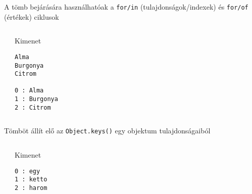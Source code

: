\begin{frame}[fragile]
  A tömb bejárására használhatóak a \texttt{for/in} (tulajdonságok/indexek) és \texttt{for/of} (értékek) ciklusok
  \footnotesize
  \begin{columns}[T]
      \begin{exampleblock}{}
        \vspace{-0.3cm}
        
        \vspace{-0.3cm}
      \end{exampleblock}
      \begin{block}{Kimenet}
        \begin{verbatim}
Alma
Burgonya
Citrom

0 : Alma
1 : Burgonya
2 : Citrom
\end{verbatim}
      \end{block}
  \end{columns}
\end{frame}

\begin{frame}[fragile]
  Tömböt állít elő az \texttt{Object.keys()} egy objektum tulajdonságaiból
  \small
  \begin{columns}[T]
      \begin{exampleblock}{}
        
      \end{exampleblock}
      \begin{block}{Kimenet}
        \begin{verbatim}
0 : egy
1 : ketto
2 : harom
\end{verbatim}
      \end{block}
  \end{columns}
\end{frame}

